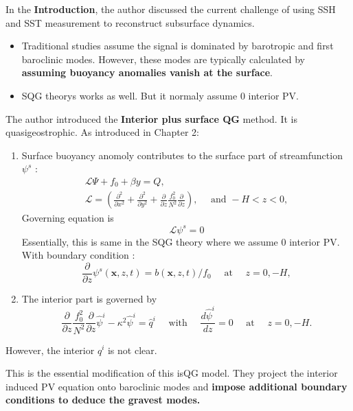 \documentclass[../SQG_notes.tex]{subfiles}
\begin{document}
    In the \textbf{Introduction}, the author discussed the current challenge of using SSH and SST  measurement to reconstruct subsurface dynamics. \par
    \begin{itemize}
        \item     Traditional studies assume the signal is dominated by barotropic and first baroclinic modes. However, these modes are typically calculated by \textbf{assuming buoyancy anomalies vanish at the surface}. 
        \item SQG theorys works as well. But it normaly assume $0$ interior PV. 
    \end{itemize}
    The author introduced the \textbf{Interior plus surface QG} method. It is quasigeostrophic. As introduced in Chapter 2: 
    \begin{enumerate}
        \item Surface buoyancy anomoly contributes to the surface part of streamfunction $\psi^s$ : 
        \[
        \begin{gathered}
        \mathcal{L} \Psi+f_0+\beta y=Q, \\
        \mathcal{L}=\left(\frac{\partial^2}{\partial x^2}+\frac{\partial^2}{\partial y^2}+\frac{\partial}{\partial z} \frac{f_0^2}{N^2} \frac{\partial}{\partial z}\right), \quad \text { and }-H<z<0,
        \end{gathered}
        \]
        Governing equation is 
        \[
        \mathcal{L} \psi^s=0
        \]
        Essentially, this is same in the SQG theory where we assume $0$ interior PV. With boundary condition : 
        \[
        \frac{\partial}{\partial z} \psi^s(\mathbf{x}, z, t)=b(\mathbf{x}, z, t) / f_0 \quad \text { at } \quad z=0,-H,
        \]
        \item The interior part is governed by 
        \[
        \frac{\partial}{\partial z} \frac{f_0^2}{N^2} \frac{\partial}{\partial z} \hat{\psi}^i-\kappa^2 \hat{\psi}^i=\hat{q}^i \quad \text { with } \quad \frac{d \hat{\psi}^i}{d z}=0 \quad \text { at } \quad z=0,-H .
        \]
    \end{enumerate}
    However, the interior $q^i$ is not clear. 
    \begin{remark}
        This is the essential modification of this isQG model. They project the interior induced PV equation onto baroclinic modes and \textbf{impose additional boundary conditions to deduce the gravest modes.}
    \end{remark}
\end{document}
